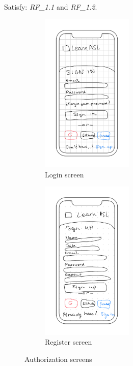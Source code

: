 Satisfy: \textit{RF\_1.1} and \textit{RF\_1.2}. \\
\begin{figure}[H]
    \centering
    \begin{subfigure}[T]{0.49\textwidth}
        \centering
        \includegraphics[width=0.48\textwidth]{assets/screens/auth/Login.png}
        \caption{Login screen}
        \label{fig:design_screen_login}
    \end{subfigure}
    \hfill
    \begin{subfigure}[T]{0.49\textwidth}
        \centering
        \includegraphics[width=0.48\textwidth]{assets/screens/auth/Register.png}
        \caption{Register screen}
        \label{fig:design_screen_camera_register}
    \end{subfigure}
       \caption{Authorization screens}
       \label{fig:design_screens_auth}
\end{figure}

